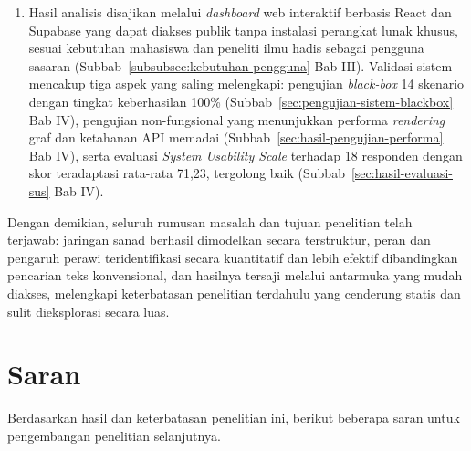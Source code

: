 \begin{enumerate}
	\item Hasil analisis disajikan melalui \textit{dashboard} web interaktif berbasis React dan Supabase yang dapat diakses publik tanpa instalasi perangkat lunak khusus, sesuai kebutuhan mahasiswa dan peneliti ilmu hadis sebagai pengguna sasaran (Subbab~\ref{subsubsec:kebutuhan-pengguna} Bab III). Validasi sistem mencakup tiga aspek yang saling melengkapi: pengujian \textit{black-box} 14 skenario dengan tingkat keberhasilan 100\% (Subbab~\ref{sec:pengujian-sistem-blackbox} Bab IV), pengujian non-fungsional yang menunjukkan performa \textit{rendering} graf dan ketahanan API memadai (Subbab~\ref{sec:hasil-pengujian-performa} Bab IV), serta evaluasi \textit{System Usability Scale} terhadap 18 responden dengan skor teradaptasi rata-rata 71,23, tergolong baik (Subbab~\ref{sec:hasil-evaluasi-sus} Bab IV).
\end{enumerate}

Dengan demikian, seluruh rumusan masalah dan tujuan penelitian telah terjawab: jaringan sanad berhasil dimodelkan secara terstruktur, peran dan pengaruh perawi teridentifikasi secara kuantitatif dan lebih efektif dibandingkan pencarian teks konvensional, dan hasilnya tersaji melalui antarmuka yang mudah diakses, melengkapi keterbatasan penelitian terdahulu yang cenderung statis dan sulit dieksplorasi secara luas.

\section{Saran}

Berdasarkan hasil dan keterbatasan penelitian ini, berikut beberapa saran untuk pengembangan penelitian selanjutnya.

